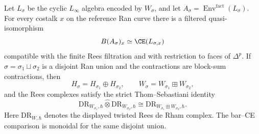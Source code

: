 \begin{proposition}
Let $L_\sigma$ be the cyclic $L_\infty$ algebra encoded by
$W_\sigma$, and let
$A_\sigma=\operatorname{Env}^{\mathrm{fact}}(L_\sigma)$. For every
costalk $x$ on the reference Ran curve there is a filtered
quasi-isomorphism
\[
 B(A_\sigma)_x\simeq \CE(L_{\sigma,x})
\]
compatible with the finite Rees filtration and with restriction to
faces of $\Delta^p$. If $\sigma=\sigma_1\sqcup\sigma_2$ is a disjoint
Ran union and the contractions are block-sum contractions, then
\[
 H_\sigma=H_{\sigma_1}\oplus H_{\sigma_2},\qquad
 W_\sigma=W_{\sigma_1}\boxplus W_{\sigma_2},
\]
and the Rees complexes satisfy the strict Thom--Sebastiani identity
\[
 \mathrm{DR}_{W_{\sigma_1},\hbar}\widehat{\otimes}
 \mathrm{DR}_{W_{\sigma_2},\hbar}
 \cong
 \mathrm{DR}_{W_{\sigma_1}\boxplus W_{\sigma_2},\hbar}.
\]
Here $\mathrm{DR}_{W,\hbar}$ denotes the displayed twisted Rees de Rham
complex.
The bar--CE comparison is monoidal for the same disjoint union.
\end{proposition}

